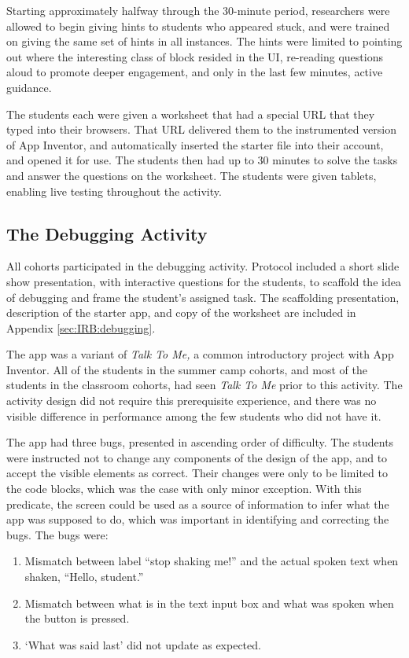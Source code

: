 Starting approximately halfway through the 30-minute period, researchers were allowed to begin giving hints to students who appeared stuck, and were trained on giving the same set of hints in all instances. The hints were limited to pointing out where the interesting class of block resided in the UI, re-reading questions aloud to promote deeper engagement, and only in the last few minutes, active guidance. 

The students each were given a worksheet that had a special URL that they typed into their browsers. That URL delivered them to the instrumented version of App Inventor, and automatically inserted the starter file into their account, and opened it for use. The students then had up to 30 minutes to solve the tasks and answer the questions on the worksheet. The students were given tablets, enabling live testing throughout the activity. 


\subsection{The Debugging Activity}
All cohorts participated in the debugging activity. Protocol included a short slide show presentation, with interactive questions for the students, to scaffold the idea of debugging and frame the student's assigned task. The scaffolding presentation, description of the starter app, and copy of the worksheet are included in Appendix \ref{sec:IRB:debugging}.

The app was a variant of \emph{Talk To Me,} a common introductory project with App Inventor. All of the students in the summer camp cohorts, and most of the students in the classroom cohorts, had seen \emph{Talk To Me} prior to this activity. The activity design did not require this prerequisite experience, and there was no visible difference in performance among the few students who did not have it. 

The app had three bugs, presented in ascending order of difficulty. The students were instructed not to change any components of the design of the app, and to accept the visible elements as correct. Their changes were only to be limited to the code blocks, which was the case with only minor exception. With this predicate, the screen could be used as a source of information to infer what the app was supposed to do, which was important in identifying and correcting the bugs. The bugs were:

\begin{enumerate}
\item Mismatch between label ``stop shaking me!'' and the actual spoken text when shaken, ``Hello, student.''
\item Mismatch between what is in the text input box and what was spoken when the button is pressed.
\item `What was said last' did not update as expected.
\end{enumerate}

